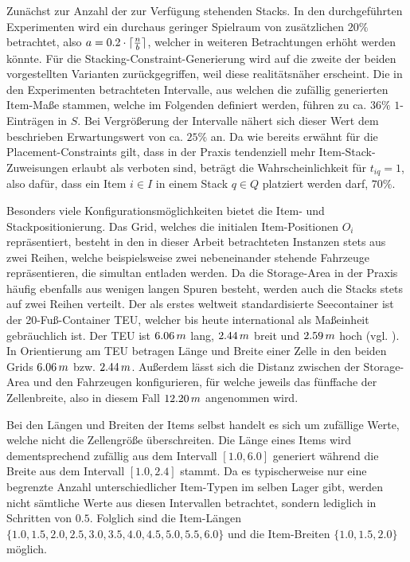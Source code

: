 Zunächst zur Anzahl der zur Verfügung stehenden Stacks. In den durchgeführten Experimenten wird ein durchaus geringer Spielraum von
zusätzlichen $20 \%$ betrachtet, also $a = 0.2 \cdot \lceil\frac{n}{b}\rceil$, welcher in weiteren Betrachtungen erhöht werden könnte.
Für die Stacking-Constraint-Generierung wird auf die zweite der beiden vorgestellten Varianten zurückgegriffen,
weil diese realitätsnäher erscheint. Die in den Experimenten betrachteten Intervalle, aus welchen die zufällig generierten
Item-Maße stammen, welche im Folgenden definiert werden, führen zu ca. $36\%$ $1$-Einträgen in $S$.
Bei Vergrößerung der Intervalle nähert sich dieser Wert dem beschrieben Erwartungswert von ca. $25\%$ an.
Da wie bereits erwähnt für die Placement-Constraints gilt, dass in der Praxis tendenziell mehr Item-Stack-Zuweisungen erlaubt
als verboten sind, beträgt die Wahrscheinlichkeit für $t_{iq} = 1$, also dafür, dass ein Item $i \in I$ in einem
Stack $q \in Q$ platziert werden darf, $70 \%$.

Besonders viele Konfigurationsmöglichkeiten bietet die Item- und Stackpositionierung.
Das Grid, welches die initialen Item-Positionen $O_i$ repräsentiert, besteht in den in dieser Arbeit betrachteten
Instanzen stets aus zwei Reihen, welche beispielsweise zwei nebeneinander stehende Fahrzeuge repräsentieren,
die simultan entladen werden. Da die Storage-Area in der Praxis häufig ebenfalls aus wenigen langen Spuren besteht,
werden auch die Stacks stets auf zwei Reihen verteilt.
Der als erstes weltweit standardisierte Seecontainer ist der 20-Fuß-Container TEU, welcher bis heute
international als Maßeinheit gebräuchlich ist. Der TEU ist $6.06 \thinspace m$ lang, $2.44 \thinspace m$ breit
und $2.59 \thinspace m$ hoch (vgl. \citet{ContainerBasis}).
In Orientierung am TEU betragen Länge und Breite einer Zelle in den beiden Grids $6.06 \thinspace m$ bzw.
$2.44 \thinspace m$. Außerdem lässt sich die Distanz zwischen der Storage-Area und den Fahrzeugen konfigurieren,
für welche jeweils das fünffache der Zellenbreite, also in diesem Fall $12.20 \thinspace m$ angenommen wird.

Bei den Längen und Breiten der Items selbst handelt es sich um zufällige Werte, welche nicht die Zellengröße überschreiten.
Die Länge eines Items wird dementsprechend zufällig aus dem Intervall $[1.0, 6.0]$ generiert während die Breite aus dem
Intervall $[1.0, 2.4]$ stammt. Da es typischerweise nur eine begrenzte Anzahl unterschiedlicher Item-Typen im selben Lager
gibt, werden nicht sämtliche Werte aus diesen Intervallen betrachtet, sondern lediglich in Schritten von $0.5$.
Folglich sind die Item-Längen $\{1.0, 1.5, 2.0, 2.5, 3.0, 3.5, 4.0, 4.5, 5.0, 5.5, 6.0\}$ und
die Item-Breiten $\{1.0, 1.5, 2.0\}$ möglich.

